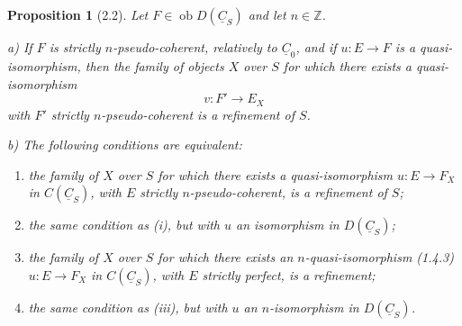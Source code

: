 \documentclass[13pt]{extarticle}
\newcommand{\ZZ}{\mathbb Z}
\newcommand{\uC}{\underline C}
\newcommand{\ob}{\operatorname{ob}}
\newtheorem*{proposition*}{Proposition}
\begin{document}
\begin{proposition*}[2.2]
Let $F\in\ob D(\uC_S)$ and let $n\in\ZZ$.

\textup{a)} If $F$ is strictly $n$-pseudo-coherent, relatively to $\uC_0$, and if $u:E\to F$ is a quasi-isomorphism, then the family of objects $X$ over $S$ for which there exists a quasi-isomorphism
\[
v:F'\longrightarrow E_X
\]
with $F'$ strictly $n$-pseudo-coherent is a refinement of $S$.

\textup{b)} The following conditions are equivalent:
\begin{enumerate}[label=(\roman*)]
\item the family of $X$ over $S$ for which there exists a quasi-isomorphism $u:E\to F_X$ in $C(\uC_S)$, with $E$ strictly $n$-pseudo-coherent, is a refinement of $S$;
\item the same condition as (i), but with $u$ an isomorphism in $D(\uC_S)$;
\item the family of $X$ over $S$ for which there exists an $n$-quasi-isomorphism (1.4.3) $u:E\to F_X$ in $C(\uC_S)$, with $E$ strictly perfect, is a refinement;
\item the same condition as (iii), but with $u$ an $n$-isomorphism in $D(\uC_S)$.
\end{enumerate}
\end{proposition*}
\end{document}

